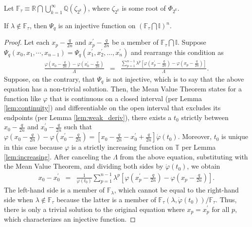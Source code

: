 \begin{definition}
  \label{def:F}
  Let $\mathbb{F}_\tau \equiv \mathbb{R} \bigcap \bigcup\limits_{k = 1}^\infty \mathbb{Q}\left(\zeta_{2^k}\right)$, where $\zeta_{2^k}$ is some root of $\Phi_{2^k}$.
\end{definition}

\begin{lemma}
  \label{lem:injective}
  If $\lambda \notin \mathbb{F}_\tau$, then $\Psi_q$ is an injective function on $\left(\mathbb{F}_\tau \bigcap \mathbb{I}\right)^n$.
\end{lemma}
\begin{proof}
  Let each $x_p - \frac{q}{2n}$ and $x_p^\prime - \frac{q}{2n}$ be a member of $\mathbb{F}_\tau \bigcap \mathbb{I}$. Suppose $\Psi_q\left(x_0, x_1, \cdots, x_{n - 1}\right) = \Psi_q\left(x_1^\prime, x_2^\prime, \dots, x_n^\prime\right)$ and rearrange this condition as
  \begin{eqnarray*}
      \frac{\varphi\left(x_0 - \frac{q}{2n}\right) - \varphi\left(x_0^\prime - \frac{q}{2n}\right)}{\Lambda} &=& \frac{\sum\limits_{p = 1}^{n - 1}\lambda^p \left[\varphi\left(x_p^\prime - \frac{q}{2n}\right) - \varphi\left(x_p - \frac{q}{2n}\right)\right]}{\Lambda}.
  \end{eqnarray*}  
  Suppose, on the contrary, that $\Psi_q$ is not injective, which is to say that the above equation has a non-trivial solution. Then, the Mean Value Theorem states for a function like $\varphi$ that is continuous on a closed interval (per Lemma \ref{lem:continuity}) and differentiable on the open interval that excludes its endpoints (per Lemma \ref{lem:weak_deriv}), there exists a $t_0$ strictly between $x_0 - \frac{q}{2n}$ and $x_0^\prime - \frac{q}{2n}$ such that $\varphi\left(x_0 - \frac{q}{2n}\right) - \varphi\left(x_0^\prime - \frac{q}{2n}\right) = \left[x_0 - \frac{q}{2n} - x_0^\prime + \frac{q}{2n}\right] \dot{\varphi}\left(t_0\right)$. Moreover, $t_0$ is unique in this case because $\varphi$ is a strictly increasing function on $\mathbb{T}$ per Lemma \ref{lem:increasing}. After canceling the $\Lambda$ from the above equation, substituting with the Mean Value Theorem, and dividing both sides by $\dot{\varphi}\left(t_0\right)$, we obtain
  \begin{eqnarray*}
      x_0 - x_0^\prime &=& \frac{1}{\dot{\varphi}\left(t_0\right)}\sum\limits_{p = 1}^{n - 1}\lambda^p \left[\varphi\left(x_p^\prime - \frac{q}{2n}\right) - \varphi\left(x_p - \frac{q}{2n}\right)\right].
  \end{eqnarray*}
  The left-hand side is a member of $\mathbb{F}_\lambda$, which cannot be equal to the right-hand side when $\lambda \notin \mathbb{F}_\tau$ because the latter is a member of $\mathbb{F}_\tau\left(\lambda, \dot{\varphi}\left(t_0\right)\right) / \mathbb{F}_\tau$. Thus, there is only a trivial solution to the original equation where $x_p = x_p^\prime$ for all $p$, which characterizes an injective function.
\end{proof}

